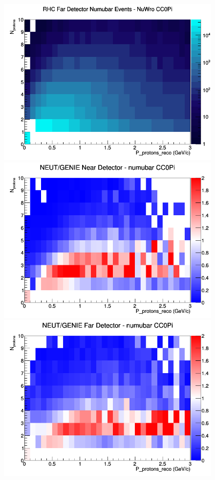 \documentclass[12pt]{article}
\begin{document}
\begin{figure}[h]
\endminipage
{}
\includegraphics[width=\linewidth]{eff_N_P/GAr/protons/CC0Pi_RHC_FD_numubar_N_P_NuWro.png}
\endminipage
\newline
{}
\includegraphics[width=\linewidth]{eff_N_P/GAr/protons/ratios/CC0Pi_NEUT_GENIE_numubar_near_N_P.png}
\endminipage
{}
\includegraphics[width=\linewidth]{eff_N_P/GAr/protons/ratios/CC0Pi_NEUT_GENIE_numubar_far_N_P.png}

\end{figure}
\end{document}
